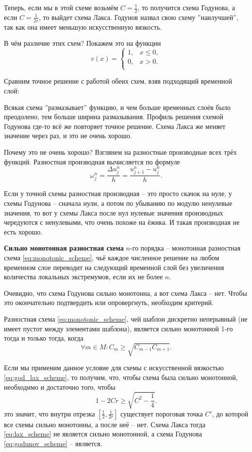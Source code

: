 \documentclass[../main.tex]{subfile}
\begin{document}
Теперь, если мы в этой схеме возьмём $C=\frac{1}{2}$, то получится схема
Годунова, а если $C=\frac{1}{2r}$, то выйдет схема Лакса. Годунов назвал свою
схему ''наилучшей'', так как она имеет меньшую искусственную вязкость.

В чём различие этих схем? Покажем это на функции
\[v(x)=
	\begin{cases}
		1, & x\le 0, \\
		0, & x>0. \\
	\end{cases}
\]

Сравним точное решение с работой обеих схем, взяв подходящий временной слой:



Всякая схема ''размазывает'' функцию, и чем больше временных слоёв было
преодолено, тем больше ширина размазывания. Профиль решения схемой Годунова
где-то всё же повторяет точное решение. Схема Лакса же меняет значение через
раз, и это не очень хорошо.

Почему это не очень хорошо? Взглянем на разностные производные всех трёх
функций. Разностная производная вычисляется по формуле
\[\omega_j^n=\frac{\Delta u_j^n}{h}=\frac{u_{j+1}^n-u_j^n}{h}.\]

Если у точной схемы разностная производная -- это просто скачок на нуле, у
схемы Годунова -- сначала нули, а потом по убыванию по модулю ненулевые
значения, то вот у схемы Лакса после нул нулевые значения производных
чередуются с ненулевыми, что очень похоже на ёжика. И такая производная не есть
хорошо.

\begin{define}\label{eq:strongly_monotonic_scheme}
	\textbf{Сильно монотонная разностная схема} $n$-го порядка -- монотонная
	разностная схема \eqref{eq:monotonic_scheme}, чьё каждое численное
	решение на любом временном слое переводит на следующий временной слой
	без увеличения количества локальных экстремумов, если их не более $n$.
\end{define}

Очевидно, что схема Годунова сильно монотонна, а вот схема Лакса -- нет. Чтобы
это окончательно подтвердить или опровергнуть, необходим критерий.

\begin{theorem}
	Разностная схема \eqref{eq:monotonic_scheme}, чей шаблон дискретно
	неперывный (не имеет пустот между элементами шаблона), является
	сильно монотонной 1-го тогда и только тогда, когда
	\[\forall m\in M: C_m\ge\sqrt{C_{m-1}C_{m+1}}.\]
\end{theorem}

\noproof

Если мы применим данное условие для схемы с искусственной вязкостью
\eqref{eq:god_lax_scheme}, то получим, что, чтобы схема была сильно монотонной,
необходимо и достаточно того, чтобы
\[1-2Cr\ge\sqrt{C^2-\frac{1}{4}}.\]
это значит, что внутри отрезка $[\frac{1}{2},\frac{1}{2r}]$ существует пороговая
точка $C'$, до которой все схемы сильно монотонны, а после неё -- нет. Схема
Лакса тогда \eqref{eq:lax_scheme} не является сильно монотонной, а схема
Годунова \eqref{eq:godunov_scheme} -- является.
\end{document}
